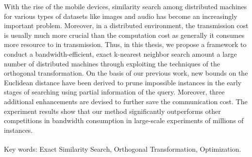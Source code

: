 \begin{abstractEN}

With the rise of the mobile devices, similarity search among distributed machines for various types of datasets like images and audio has become an increasingly important problem.  Moreover, in a distributed environment, the transmission cost is usually much more crucial than the computation cost as generally it consumes more resource to in transmission.  Thus, in this thesis, we propose a framework to conduct a bandwidth-efficient, exact k-nearest neighbor search amount a large number of distributed machines through exploiting the techniques of the orthogonal transformation.  On the basis of our previous work, new bounds on the Euclidean distance have been derived to prune impossible instances in the early stages of searching using partial information of the query.  Moreover, three additional enhancements are devised to further save the communication cost.  The experiment results show that our method significantly outperforms other competitions in bandwidth consumption in large-scale experiments of millions of instances.
\\ \\
Key words: Exact Similarity Search, Orthogonal Transformation, Optimization.

\end{abstractEN}
